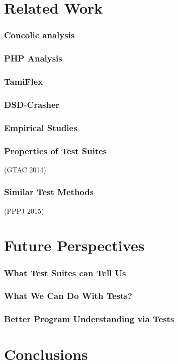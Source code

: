 \documentclass{beamer}
\begin{document}
\section{Related Work}

\begin{frame}
  \frametitle{Concolic analysis}
\end{frame}

\begin{frame}
  \frametitle{PHP Analysis}
\end{frame}

\begin{frame}
  \frametitle{TamiFlex}
\end{frame}

\begin{frame}
  \frametitle{DSD-Crasher}
\end{frame}

\begin{frame}
  \frametitle{Empirical Studies}
\end{frame}

\begin{frame}
  \frametitle{Properties of Test Suites}
  (GTAC 2014)
\end{frame}

\begin{frame}
  \frametitle{Similar Test Methods}
  (PPPJ 2015)
\end{frame}

\section{Future Perspectives}

\begin{frame}
  \frametitle{What Test Suites can Tell Us}
\end{frame}

\begin{frame}
  \frametitle{What We Can Do With Tests?}
\end{frame}

\begin{frame}
  \frametitle{Better Program Understanding via Tests}
\end{frame}

\section{Conclusions}
\end{document}
